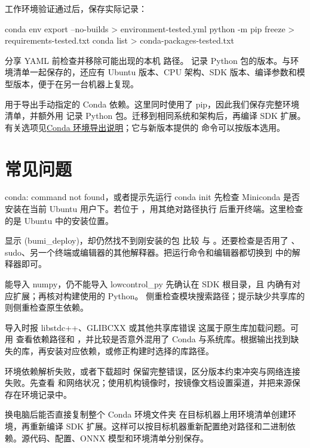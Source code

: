 工作环境验证通过后，保存实际记录：
\begin{command}
conda env export --no-builds > environment-tested.yml
python -m pip freeze > requirements-tested.txt
conda list > conda-packages-tested.txt
\end{command}
分享 YAML 前检查并移除可能出现的本机  路径。 记录 Python 包的版本。与环境清单一起保存的，还应有 Ubuntu 版本、CPU 架构、SDK 版本、编译参数和模型版本，便于在另一台机器上复现。

 用于导出手动指定的 Conda 依赖。这里同时使用了 pip，因此我们保存完整环境清单，并额外用  记录 Python 包。迁移到相同系统和架构后，再编译 SDK 扩展。有关选项见\href{https://docs.conda.io/projects/conda/en/stable/commands/env/export.html}{Conda 环境导出说明}；它与新版本提供的  命令可以按版本选用。

\section{常见问题}
\begin{faq}{conda: command not found，或者提示先运行 conda init}
先检查 Miniconda 是否安装在当前 Ubuntu 用户下。若位于 ，用其绝对路径执行  后重开终端。这里检查的是 Ubuntu 中的安装位置。
\end{faq}
\begin{faq}{显示 (bumi\_deploy)，却仍然找不到刚安装的包}
比较  与 。还要检查是否用了 、sudo、另一个终端或编辑器的其他解释器。把运行命令和编辑器都切换到  中的解释器即可。
\end{faq}
\begin{faq}{能导入 numpy，仍不能导入 lowcontrol\_py}
先确认在 SDK 根目录，且  内确有对应扩展；再核对构建使用的 Python。 侧重检查模块搜索路径；提示缺少共享库的  则侧重检查原生依赖。
\end{faq}
\begin{faq}{导入时报 libstdc++、GLIBCXX 或其他共享库错误}
这属于原生库加载问题。可用  查看依赖路径和 ，并比较是否意外混用了 Conda 与系统库。根据输出找到缺失的库，再安装对应依赖，或修正构建时选择的库路径。
\end{faq}
\begin{faq}{环境依赖解析失败，或者下载超时}
保留完整错误，区分版本约束冲突与网络连接失败。先查看  和网络状况；使用机构镜像时，按镜像文档设置渠道，并把来源保存在环境记录中。
\end{faq}
\begin{faq}{换电脑后能否直接复制整个 Conda 环境文件夹}
在目标机器上用环境清单创建环境，再重新编译 SDK 扩展。这样可以按目标机器重新配置绝对路径和二进制依赖。源代码、配置、ONNX 模型和环境清单分别保存。
\end{faq}

